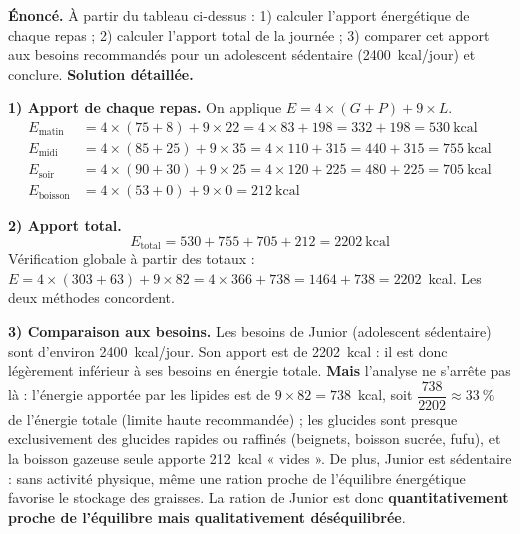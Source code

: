 \documentclass[11pt]{article}
\begin{document}
\begin{exoresolu}
\textbf{Énoncé.} À partir du tableau ci-dessus : 1) calculer l'apport énergétique de chaque repas ; 2) calculer l'apport total de la journée ; 3) comparer cet apport aux besoins recommandés pour un adolescent sédentaire (\num{2400}~kcal/jour) et conclure.
\tcblower
\textbf{Solution détaillée.}

\textbf{1) Apport de chaque repas.} On applique $E = 4 \times (G + P) + 9 \times L$.
\begin{align*}
E_{\text{matin}} &= 4 \times (75 + 8) + 9 \times 22 = 4 \times 83 + 198 = 332 + 198 = 530~\text{kcal} \\
E_{\text{midi}} &= 4 \times (85 + 25) + 9 \times 35 = 4 \times 110 + 315 = 440 + 315 = 755~\text{kcal} \\
E_{\text{soir}} &= 4 \times (90 + 30) + 9 \times 25 = 4 \times 120 + 225 = 480 + 225 = 705~\text{kcal} \\
E_{\text{boisson}} &= 4 \times (53 + 0) + 9 \times 0 = 212~\text{kcal}
\end{align*}

\textbf{2) Apport total.}
\[ E_{\text{total}} = 530 + 755 + 705 + 212 = \num{2202}~\text{kcal} \]
Vérification globale à partir des totaux : $E = 4 \times (303 + 63) + 9 \times 82 = 4 \times 366 + 738 = \num{1464} + 738 = \num{2202}$~kcal. Les deux méthodes concordent.

\textbf{3) Comparaison aux besoins.} Les besoins de Junior (adolescent sédentaire) sont d'environ \num{2400}~kcal/jour. Son apport est de \num{2202}~kcal : il est donc légèrement inférieur à ses besoins en énergie totale. \textbf{Mais} l'analyse ne s'arrête pas là : l'énergie apportée par les lipides est de $9 \times 82 = 738$~kcal, soit $\dfrac{738}{2202} \approx 33~\%$ de l'énergie totale (limite haute recommandée) ; les glucides sont presque exclusivement des glucides rapides ou raffinés (beignets, boisson sucrée, fufu), et la boisson gazeuse seule apporte 212~kcal « vides ». De plus, Junior est sédentaire : sans activité physique, même une ration proche de l'équilibre énergétique favorise le stockage des graisses. La ration de Junior est donc \textbf{quantitativement proche de l'équilibre mais qualitativement déséquilibrée}.
\end{exoresolu}
\end{document}
